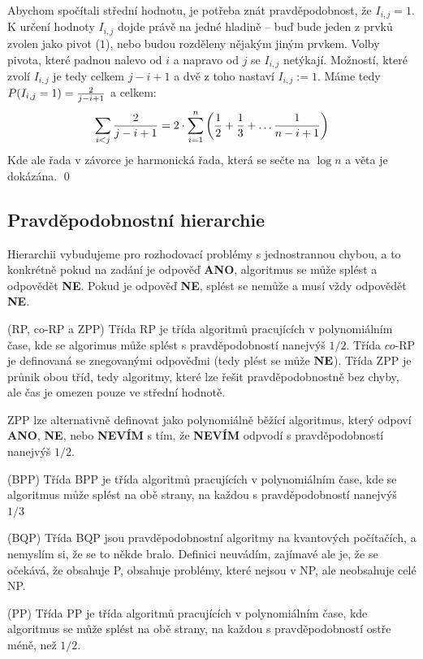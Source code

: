 Abychom spočítali střední hodnotu, je potřeba znát pravděpodobnost, že $I_{i,j}
= 1$. K určení hodnoty $I_{i,j}$ dojde právě na jedné hladině -- buď bude jeden
z prvků zvolen jako pivot ($1$), nebo budou rozděleny nějakým jiným prvkem.
Volby pivota, které padnou nalevo od $i$ a napravo od $j$ se $I_{i,j}$ netýkají.
Možností, které zvolí $I_{i,j}$ je tedy celkem ${j-i+1}$ a dvě z toho nastaví
$I_{i,j} := 1$. Máme tedy $P(I_{i,j} = 1) = {2 \over j-i+1}$ a celkem:
\begin{align}
	\sum_{i < j} {2 \over j-i+1} = 2 \cdot \sum_{i=1}^n \left( {1 \over 2} + {1
		\over 3} +
	\dots {1 \over n-i+1}\right)
\end{align}
Kde ale řada v závorce je harmonická řada, která se sečte na $\log n$ a věta je
dokázána. \qed

\subsection{Pravděpodobnostní hierarchie}

Hierarchii vybudujeme pro rozhodovací problémy s jednostrannou chybou, a to
konkrétně pokud na zadání je odpověď {\bf ANO}, algoritmus se může splést a
odpovědět {\bf NE}. Pokud je odpověď {\bf NE}, splést se nemůže a musí vždy
odpovědět {\bf NE}.

\df (RP, co-RP a ZPP) Třída RP je třída algoritmů pracujících v polynomiálním
čase, kde se algorimus může splést s pravděpodobností nanejvýš $1/2$. Třída
$co$-RP je definovaná se znegovanými odpověďmi (tedy plést se může ${\bf NE}$).
Třída ZPP je průnik obou tříd, tedy algoritmy, které lze řešit
pravděpodobnostně bez chyby, ale čas je omezen pouze ve střední hodnotě.

\poz ZPP lze alternativně definovat jako polynomiálně běžící algoritmus, který
odpoví {\bf ANO}, {\bf NE}, nebo {\bf NEVÍM} s tím, že {\bf NEVÍM} odpvodí s
pravděpodobností nanejvýš $1/2$.

\df (BPP) Třída BPP je třída algoritmů pracujících v polynomiálním čase, kde se
algoritmus může splést na obě strany, na každou s pravděpodobností nanejvýš
$1/3$

\df (BQP) Třída BQP jsou pravděpodobnostní algoritmy na kvantových počítačích, a
nemyslím si, že se to někde bralo. Definici neuvádím, zajímavé ale je, že se
očekává, že obsahuje P, obsahuje problémy, které nejsou v NP, ale neobsahuje
celé NP.

\df (PP) Třída PP je třída algoritmů pracujících v polynomiálním čase, kde
algoritmus se může splést na obě strany, na každou s pravděpodobností ostře
méně, než $1/2$.

